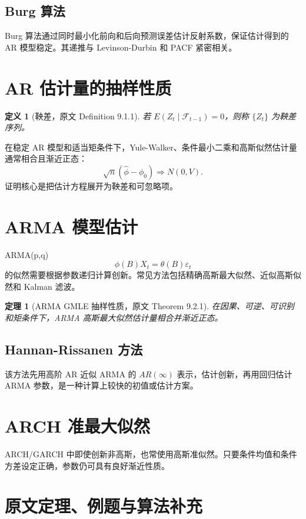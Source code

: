 \documentclass[11pt,a4paper,openany]{ctexbook}
\newtheorem{definition}{定义}[section]
\newtheorem{theorem}{定理}[section]
\begin{document}
\subsection{Burg 算法}

Burg 算法通过同时最小化前向和后向预测误差估计反射系数，保证估计得到的 AR 模型稳定。其递推与 Levinson-Durbin 和 PACF 紧密相关。

\section{AR 估计量的抽样性质}

\begin{definition}[鞅差，原文 Definition 9.1.1]
若 \(E(Z_t\mid\mathcal F_{t-1})=0\)，则称 \(\{Z_t\}\) 为鞅差序列。
\end{definition}

在稳定 AR 模型和适当矩条件下，Yule-Walker、条件最小二乘和高斯似然估计量通常相合且渐近正态：
\[
  \sqrt n(\hat\phi-\phi_0)\Rightarrow N(0,V).
\]
证明核心是把估计方程展开为鞅差和可忽略项。

\section{ARMA 模型估计}

ARMA(p,q)
\[
  \phi(B)X_t=\theta(B)\varepsilon_t
\]
的似然需要根据参数递归计算创新。常见方法包括精确高斯最大似然、近似高斯似然和 Kalman 滤波。

\begin{theorem}[ARMA GMLE 抽样性质，原文 Theorem 9.2.1]
在因果、可逆、可识别和矩条件下，ARMA 高斯最大似然估计量相合并渐近正态。
\end{theorem}

\subsection{Hannan-Rissanen 方法}

该方法先用高阶 AR 近似 ARMA 的 \(AR(\infty)\) 表示，估计创新，再用回归估计 ARMA 参数，是一种计算上较快的初值或估计方案。

\section{ARCH 准最大似然}

ARCH/GARCH 中即使创新非高斯，也常使用高斯准似然。只要条件均值和条件方差设定正确，参数仍可具有良好渐近性质。

\section{原文定理、例题与算法补充}
\end{document}
